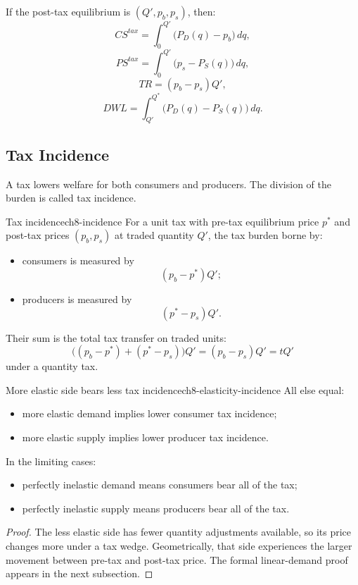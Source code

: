 \begin{keyformula}[title={Key Formula: Welfare Accounting under an Ad-Valorem Tax}]
If the post-tax equilibrium is $(Q',p_b,p_s)$, then:
\[
CS^{tax}=\int_0^{Q'} \bigl(P_D(q)-p_b\bigr)\,dq,
\]
\[
PS^{tax}=\int_0^{Q'} \bigl(p_s-P_S(q)\bigr)\,dq,
\]
\[
TR=(p_b-p_s)Q',
\]
\[
DWL=\int_{Q'}^{Q^*} \bigl(P_D(q)-P_S(q)\bigr)\,dq.
\]
\end{keyformula}

\subsection{Tax Incidence}

A tax lowers welfare for both consumers and producers. The division of the burden is called tax incidence.

\begin{definition}{Tax incidence}{ch8-incidence}
For a unit tax with pre-tax equilibrium price $p^*$ and post-tax prices $(p_b,p_s)$ at traded quantity $Q'$, the tax burden borne by:
\begin{itemize}
    \item consumers is measured by
    \[
    (p_b-p^*)Q';
    \]
    \item producers is measured by
    \[
    (p^*-p_s)Q'.
    \]
\end{itemize}
Their sum is the total tax transfer on traded units:
\[
\bigl((p_b-p^*)+(p^*-p_s)\bigr)Q'
=
(p_b-p_s)Q'
=
tQ'
\]
under a quantity tax.
\end{definition}

\begin{theorem}{More elastic side bears less tax incidence}{ch8-elasticity-incidence}
All else equal:
\begin{itemize}
    \item more elastic demand implies lower consumer tax incidence;
    \item more elastic supply implies lower producer tax incidence.
\end{itemize}
In the limiting cases:
\begin{itemize}
    \item perfectly inelastic demand means consumers bear all of the tax;
    \item perfectly inelastic supply means producers bear all of the tax.
\end{itemize}
\end{theorem}

\begin{proof}
The less elastic side has fewer quantity adjustments available, so its price changes more under a tax wedge. Geometrically, that side experiences the larger movement between pre-tax and post-tax price. The formal linear-demand proof appears in the next subsection.
\end{proof}

